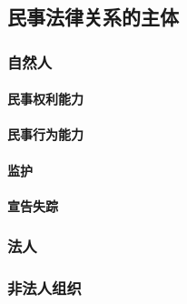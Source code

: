 \subsection{民事法律关系的主体}

\subsubsection{自然人}

\paragraph{民事权利能力}

\paragraph{民事行为能力}

\paragraph{监护}

\paragraph{宣告失踪}

\subsubsection{法人}

\subsubsection{非法人组织}